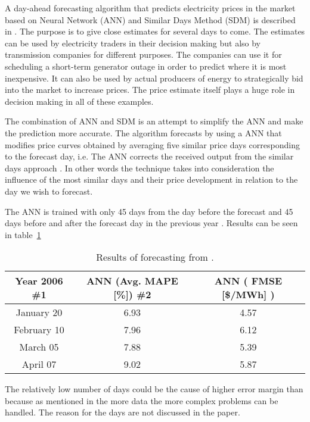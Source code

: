 A day-ahead forecasting algorithm that predicts electricity prices in the market based on Neural Network (ANN) and Similar Days Method (SDM) is described in \cite{pjmForecast}. The purpose is to give close estimates for several days to come. The estimates can be used by electricity traders in their decision making but also by transmission companies for different purposes. The companies can use it for scheduling a short-term generator outage in order to predict where it is most inexpensive. It can also be used by actual producers of energy to strategically bid into the market to increase prices. The price estimate itself plays a huge role in decision making in all of these examples.

The combination of ANN and SDM is an attempt to simplify the ANN and make the prediction more accurate. The algorithm forecasts by using a ANN that modifies price curves obtained by averaging five similar price days corresponding to the forecast day, i.e. The ANN corrects the received output from the similar days approach \cite{pjmForecast}. In other words the technique takes into consideration the influence of the most similar days and their price development in relation to the day we wish to forecast.

The ANN is trained with only 45 days from the day before the forecast and 45 days before and after the forecast day in the previous year \cite{pjmForecast}. Results can be seen in table~\ref{table:sdmresult}

\begin{table}[h!]
\centering  %
\begin{tabular}{c c c} %
Year 2006 \#1 & ANN (Avg. MAPE [\%]) \#2 & ANN ( FMSE [\$/MWh] ) \\ [0.5ex] %
\hline                  %
January 20 & 6.93 & 4.57  \\ %
February 10 & 7.96 & 6.12  \\
March 05 & 7.88 & 5.39  \\
April 07 & 9.02 & 5.87 \\ [1ex] %
\hline %
\end{tabular}
\caption{Results of forecasting from \cite{pjmForecast}.} %
\label{table:sdmresult} %
\end{table}

The relatively low number of days could be the cause of higher error margin than \cite{FIND A SOURCE} because as mentioned in \cite{18} the more data the more complex problems can be handled. The reason for the days are not discussed in the paper.

